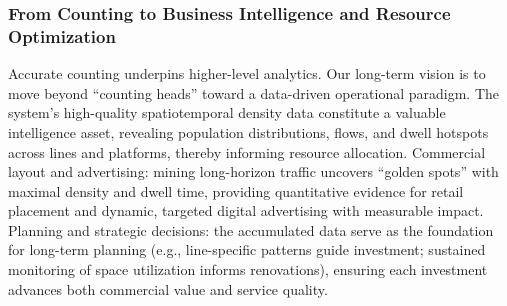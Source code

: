 \subsubsection{From Counting to Business Intelligence and Resource Optimization}
Accurate counting underpins higher-level analytics. Our long-term vision is to move beyond “counting heads” toward a data-driven operational paradigm. The system’s high-quality spatiotemporal density data constitute a valuable intelligence asset, revealing population distributions, flows, and dwell hotspots across lines and platforms, thereby informing resource allocation.
Commercial layout and advertising: mining long-horizon traffic uncovers “golden spots” with maximal density and dwell time, providing quantitative evidence for retail placement and dynamic, targeted digital advertising with measurable impact.
Planning and strategic decisions: the accumulated data serve as the foundation for long-term planning (e.g., line-specific patterns guide investment; sustained monitoring of space utilization informs renovations), ensuring each investment advances both commercial value and service quality.







